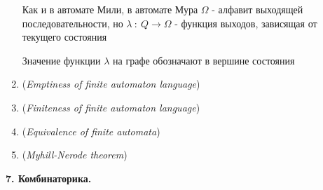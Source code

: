 \documentclass[12pt]{article}
\begin{document}
\begin{enumerate}
\begin{minipage}{\linewidth}
            Как и в автомате Мили, в автомате Мура $\Omega$ - алфавит выходящей последовательности, но
            $\lambda \ : \ Q \to \Omega$ - функция выходов, зависящая от текущего состояния

            Значение функции $\lambda$ на графе обозначают в вершине состояния

        \end{minipage}

        \smallvspace


        \item \textbf{} (\textit{Emptiness of finite automaton language})

        \item \textbf{} (\textit{Finiteness of finite automaton language})

        \item \textbf{} (\textit{Equivalence of finite automata})

        \item \textbf{} (\textit{Myhill-Nerode theorem})

    \end{enumerate}


    \begin{center}
        \textbf{7. Комбинаторика.}
    \end{center}
\end{document}

